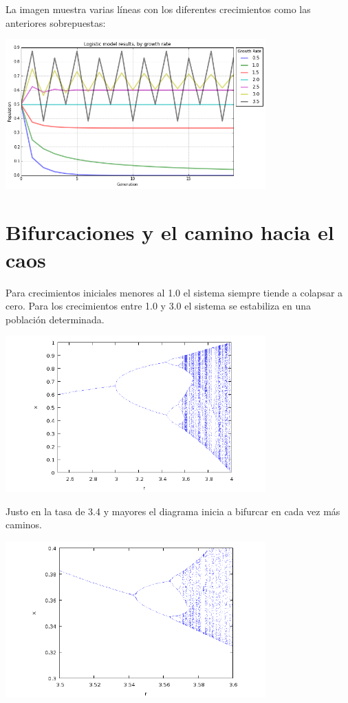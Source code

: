 \documentclass{article} %
\begin{document}
La imagen muestra varias líneas con los diferentes crecimientos como las anteriores sobrepuestas:

\begin{center}

	\includegraphics[width=10cm]{logistic-model-line.png}
    
\end{center}


\section*{Bifurcaciones y el camino hacia el caos}

Para crecimientos iniciales menores al 1.0 el sistema siempre tiende a colapsar a cero. Para los crecimientos entre 1.0 y 3.0 el sistema se estabiliza en una población determinada. 

\begin{center}

	\includegraphics[width=10cm]{4.png}
    
\end{center}

Justo en la tasa de 3.4 y mayores el diagrama inicia a bifurcar en cada vez más caminos. 


\begin{center}

	\includegraphics[width=10cm]{5.png}
    
\end{center}
\end{document}
